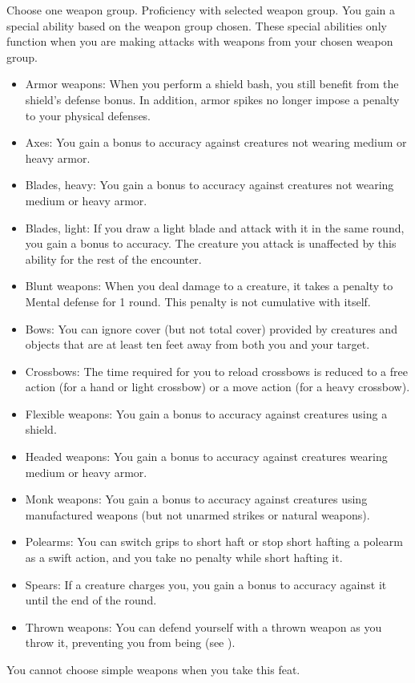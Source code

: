 Choose one weapon group.
\featpre Proficiency with selected weapon group.
\featben You gain a special ability based on the weapon group chosen.
These special abilities only function when you are making attacks with weapons from your chosen weapon group.
\begin{itemize}
    \item Armor weapons: When you perform a shield bash, you still benefit from the shield's defense bonus.
        In addition, armor spikes no longer impose a penalty to your physical defenses.
    \item Axes: You gain a  bonus to accuracy against creatures not wearing medium or heavy armor.
    \item Blades, heavy: You gain a  bonus to accuracy against creatures not wearing medium or heavy armor.
    \item Blades, light: If you draw a light blade and attack with it in the same round, you gain a  bonus to accuracy.
        The creature you attack is unaffected by this ability for the rest of the encounter.
    \item Blunt weapons: When you deal damage to a creature, it takes a  penalty to Mental defense for 1 round.
        This penalty is not cumulative with itself.
    \item Bows: You can ignore cover (but not total cover) provided by creatures and objects that are at least ten feet away from both you and your target.
    \item Crossbows: The time required for you to reload crossbows is reduced to a free action (for a hand or light crossbow) or a move action (for a heavy crossbow).
    \item Flexible weapons: You gain a  bonus to accuracy against creatures using a shield.
    \item Headed weapons: You gain a  bonus to accuracy against creatures wearing medium or heavy armor.
    \item Monk weapons: You gain a  bonus to accuracy against creatures using manufactured weapons (but not unarmed strikes or natural weapons).
    \item Polearms: You can switch grips to short haft or stop short hafting a polearm as a swift action, and you take no penalty while short hafting it.
    \item Spears: If a creature charges you, you gain a  bonus to accuracy against it until the end of the round.
    \item Thrown weapons: You can defend yourself with a thrown weapon as you throw it, preventing you from being  (see ).
\end{itemize}
You cannot choose simple weapons when you take this feat.

